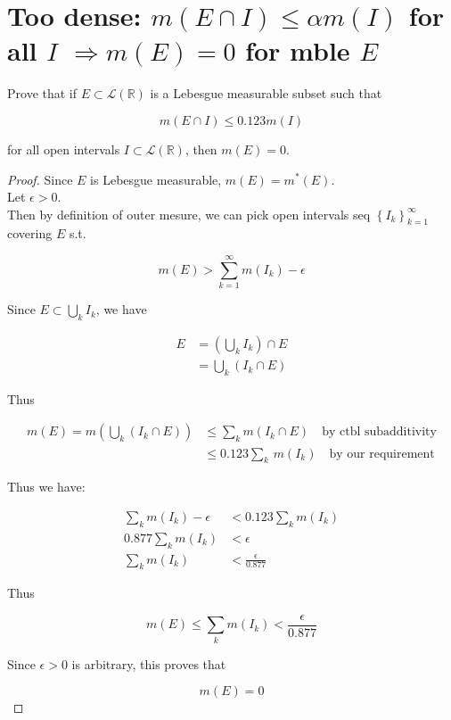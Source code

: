 \documentclass{qlnotes-export}
\begin{document}
\section{\texorpdfstring{Too dense: \(m(E \cap I) \leq \alpha m(I)\) for all \(I\) \(\Longrightarrow m(E) = 0\) for mble \(E\)}{Too dense: m(E \textbackslash cap I) \textbackslash leq \textbackslash alpha m(I) for all I \textbackslash Longrightarrow m(E) = 0 for mble E}}\label{too-dense-mecap-ile-alpha-mi-for-all-i-implies-me0-for-mble-e}

Prove that if \(E \subset \mathcal{L}({\mathbb{R}})\) is a Lebesgue measurable subset such that

\[m(E \cap I) \leq 0.123m(I)\]

for all open intervals \(I \subset \mathcal{L}({\mathbb{R}})\), then \(m(E) = 0\).

\begin{proof}

Since \(E\) is Lebesgue measurable, \(m(E) = m^{\ast}(E)\).\\
Let \(\epsilon > 0\).\\
Then by definition of outer mesure, we can pick open intervals seq \(\left\{ I_{k} \right\}_{k = 1}^{\infty}\) covering \(E\) s.t.

\[m(E) > \sum\limits_{k = 1}^{\infty}m(I_{k}) - \epsilon\]

Since \(E \subset \bigcup_{k}I_{k}\), we have

\[\begin{matrix}
E & {= (\bigcup\limits_{k}I_{k}) \cap E} \\
 & {= \bigcup\limits_{k}(I_{k} \cap E)}
\end{matrix}\]

Thus

\[\begin{matrix}
{m(E) = m(\bigcup\limits_{k}(I_{k} \cap E))} & {\leq \sum\limits_{k}m(I_{k} \cap E)\quad\text{by ctbl subadditivity}} \\
 & {\leq 0.123\sum\limits_{k}\, m(I_{k})\quad\text{by our requirement}}
\end{matrix}\]

Thus we have:

\[\begin{matrix}
{\sum\limits_{k}m(I_{k}) - \epsilon} & {< 0.123\sum\limits_{k}m(I_{k})} \\
{0.877\sum\limits_{k}m(I_{k})} & {< \epsilon} \\
{\sum\limits_{k}m(I_{k})} & {< \frac{\epsilon}{0.877}}
\end{matrix}\]

Thus

\[m(E) \leq \sum\limits_{k}m(I_{k}) < \frac{\epsilon}{0.877}\]

Since \(\epsilon > 0\) is arbitrary, this proves that

\[m(E) = 0\]

\end{proof}
\end{document}
